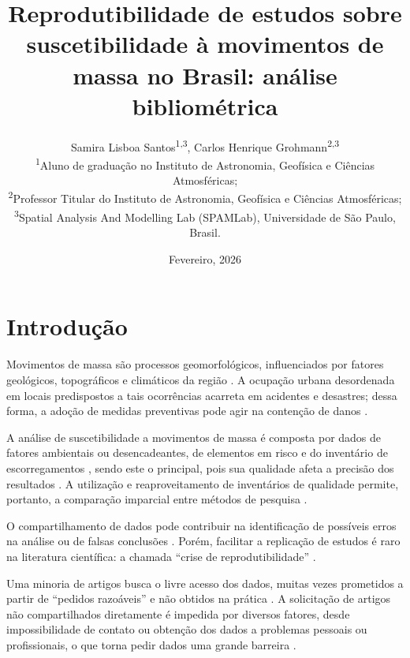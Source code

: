 \documentclass[onecolumn, A4]{article}
\begin{document}
\title{Reprodutibilidade de estudos sobre suscetibilidade à movimentos de massa no Brasil: 
análise bibliométrica}
\author{
	Samira  Lisboa Santos\textsuperscript{1,3},
	Carlos Henrique Grohmann\textsuperscript{2,3}
 	\\[0.2cm]
	{\small \textsuperscript{1}Aluno de graduação no Instituto de Astronomia, Geofísica e Ciências Atmosféricas;} \\
	{\small \textsuperscript{2}Professor Titular do Instituto de Astronomia, Geofísica e Ciências Atmosféricas;} \\
	{\small \textsuperscript{3}Spatial Analysis And Modelling Lab (SPAMLab), Universidade de São Paulo, Brasil.}
}
\date{Fevereiro, 2026}

\maketitle
\newpage

\section{Introdução}
Movimentos de massa são processos geomorfológicos, influenciados por fatores geológicos, 
topográficos e climáticos da região \citep{Varnes1978}. A ocupação urbana desordenada 
em locais predispostos a tais ocorrências acarreta em acidentes e desastres; dessa forma,
a adoção de medidas preventivas pode agir na contenção de danos \citep{ConhecerPrevenir}. 

A análise de suscetibilidade a movimentos de massa é composta por dados de fatores 
ambientais ou desencadeantes, de elementos em risco e do inventário de escorregamentos 
\citep{VanWesten}, sendo este o principal, pois sua qualidade afeta a precisão 
dos resultados \citep{Steger20162729}. A utilização e reaproveitamento de inventários de 
qualidade permite, portanto, a comparação imparcial entre métodos de pesquisa 
\citep{Coelho2024}. 

O compartilhamento de dados pode contribuir na identificação de possíveis erros na 
análise ou de falsas conclusões \citep{Munafo2017}. Porém, facilitar a replicação de 
estudos é raro na literatura científica: a chamada ``crise de reprodutibilidade'' 
\citep{Baker2016}. 

Uma minoria de artigos busca o livre acesso dos dados, muitas vezes 
prometidos a partir de ``pedidos razoáveis'' e não obtidos na prática \citep{Tedersoo2021}. 
A solicitação de artigos não compartilhados diretamente é impedida por diversos fatores,
desde impossibilidade de contato ou obtenção dos dados a problemas pessoais ou profissionais,
o que torna pedir dados uma grande barreira \citep{Hussey}.
\end{document}
